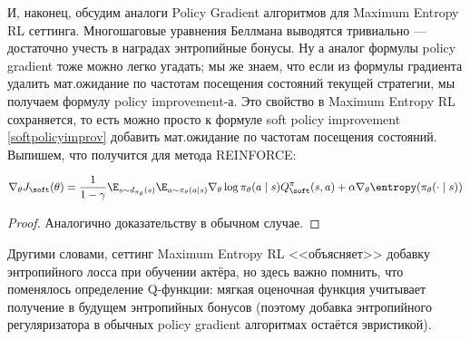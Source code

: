 И, наконец, обсудим аналоги Policy Gradient алгоритмов для Maximum Entropy RL сеттинга. Многошаговые уравнения Беллмана выводятся тривиально --- достаточно учесть в наградах энтропийные бонусы. Ну а аналог формулы policy gradient тоже можно легко угадать; мы же знаем, что если из формулы градиента удалить мат.ожидание по частотам посещения состояний текущей стратегии, мы получаем формулу policy improvement-а. Это свойство в Maximum Entropy RL сохраняется, то есть можно просто к формуле soft policy improvement \eqref{softpolicyimprov} добавить мат.ожидание по частотам посещения состояний. Выпишем, что получится для метода REINFORCE:

\begin{theorem}
$$\nabla_{\theta} J_{\soft}(\theta) = \frac{1}{1 - \gamma} \E_{s \sim d_{\pi_\theta}(s)} \E_{a \sim \pi_\theta(a \mid s)} \nabla_\theta \log \pi_\theta(a \mid s) Q^{\pi}_{\soft}(s, a) + \alpha \nabla_\theta \entropy(\pi_\theta(\cdot \mid s))$$
\begin{proof}
Аналогично доказательству в обычном случае.
\end{proof}
\end{theorem}

Другими словами, сеттинг Maximum Entropy RL <<объясняет>> добавку энтропийного лосса при обучении актёра, но здесь важно помнить, что поменялось определение Q-функции: мягкая оценочная функция учитывает получение в будущем энтропийных бонусов (поэтому добавка энтропийного регуляризатора в обычных policy gradient алгоритмах остаётся эвристикой). 




